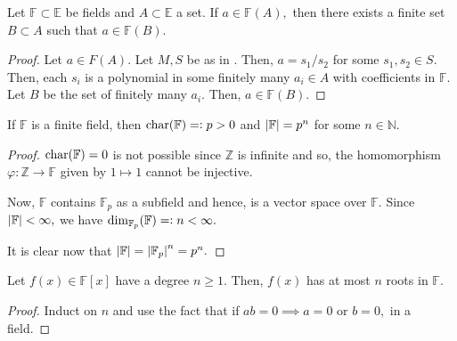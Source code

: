\begin{cor} \label{cor:FAdescfinite}
    Let $\mathbb{F} \subset \mathbb{E}$ be fields and $A \subset \mathbb{E}$ a set. If $a \in \mathbb{F}(A),$ then there exists a finite set $B \subset A$ such that $a \in \mathbb{F}(B).$
\end{cor}

\begin{proof} 
    Let $a \in F(A).$ Let $M, S$ be as in . Then, $a = s_1/s_2$ for some $s_1, s_2 \in S.$ Then, each $s_i$ is a polynomial in some finitely many $a_i \in A$ with coefficients in $\mathbb{F}.$ Let $B$ be the set of finitely many $a_i.$ Then, $a \in \mathbb{F}(B).$
\end{proof}

\begin{prop}
    If $\mathbb{F}$ is a finite field, then $\operatorname{char}(\mathbb{F}) =\vcentcolon p > 0$ and ${\left\lvert \mathbb{F} \right\lvert} = p^n$ for some $n \in \mathbb{N}.$
\end{prop}
\begin{proof} 
    $\operatorname{char}(\mathbb{F}) = 0$ is not possible since $\mathbb{Z}$ is infinite and so, the homomorphism $\varphi : \mathbb{Z} \to \mathbb{F}$ given by $1 \mapsto 1$ cannot be injective.

    Now, $\mathbb{F}$ contains $\mathbb{F}_p$ as a subfield and hence, is a vector space over $\mathbb{F}.$ Since ${\left\lvert \mathbb{F} \right\lvert} < \infty,$ we have $\dim_{\mathbb{F}_p}(\mathbb{F}) =\vcentcolon n < \infty.$

    It is clear now that ${\left\lvert \mathbb{F} \right\lvert} = {\left\lvert \mathbb{F}_p \right\lvert}^n = p^n.$
\end{proof}

\begin{thm}
    Let $f(x) \in \mathbb{F}[x]$ have a degree $n \ge 1.$ Then, $f(x)$ has at most $n$ roots in $\mathbb{F}.$
\end{thm}
\begin{proof} 
    Induct on $n$ and use the fact that if $ab = 0 \implies a = 0$ or $b = 0,$ in a field.
\end{proof}

